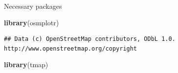 \documentclass[
  ignorenonframetext,
]{beamer}
\newenvironment{Shaded}{\begin{snugshade}}{\end{snugshade}}
\newcommand{\KeywordTok}[1]{\textcolor[rgb]{0.13,0.29,0.53}{\textbf{#1}}}
\newcommand{\NormalTok}[1]{#1}
\begin{document}
\begin{frame}[fragile]{Necessary packages}
\protect\hypertarget{necessary-packages}{}
\begin{Shaded}
\begin{Highlighting}[]
\KeywordTok{library}\NormalTok{(osmplotr)}
\end{Highlighting}
\end{Shaded}

\begin{verbatim}
## Data (c) OpenStreetMap contributors, ODbL 1.0. http://www.openstreetmap.org/copyright
\end{verbatim}

\begin{Shaded}
\begin{Highlighting}[]
\KeywordTok{library}\NormalTok{(tmap)}
\end{Highlighting}
\end{Shaded}
\end{frame}
\end{document}
